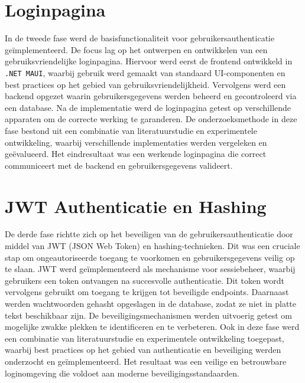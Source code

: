 \section{Loginpagina}

In de tweede fase werd de basisfunctionaliteit voor gebruikersauthenticatie geïmplementeerd. De focus lag op het ontwerpen en ontwikkelen van een gebruiksvriendelijke loginpagina. Hiervoor werd eerst de frontend ontwikkeld in \texttt{.NET MAUI}, waarbij gebruik werd gemaakt van standaard UI-componenten en best practices op het gebied van gebruiksvriendelijkheid. Vervolgens werd een backend opgezet waarin gebruikersgegevens werden beheerd en gecontroleerd via een database. Na de implementatie werd de loginpagina getest op verschillende apparaten om de correcte werking te garanderen. De onderzoeksmethode in deze fase bestond uit een combinatie van literatuurstudie en experimentele ontwikkeling, waarbij verschillende implementaties werden vergeleken en geëvalueerd. Het eindresultaat was een werkende loginpagina die correct communiceert met de backend en gebruikersgegevens valideert.

\section{JWT Authenticatie en Hashing}

De derde fase richtte zich op het beveiligen van de gebruikersauthenticatie door middel van JWT (JSON Web Token) en hashing-technieken. Dit was een cruciale stap om ongeautoriseerde toegang te voorkomen en gebruikersgegevens veilig op te slaan. JWT werd geïmplementeerd als mechanisme voor sessiebeheer, waarbij gebruikers een token ontvangen na succesvolle authenticatie. Dit token wordt vervolgens gebruikt om toegang te krijgen tot beveiligde endpoints. Daarnaast werden wachtwoorden gehasht opgeslagen in de database, zodat ze niet in platte tekst beschikbaar zijn. De beveiligingsmechanismen werden uitvoerig getest om mogelijke zwakke plekken te identificeren en te verbeteren. Ook in deze fase werd een combinatie van literatuurstudie en experimentele ontwikkeling toegepast, waarbij best practices op het gebied van authenticatie en beveiliging werden onderzocht en geïmplementeerd. Het resultaat was een veilige en betrouwbare loginomgeving die voldoet aan moderne beveiligingsstandaarden.

